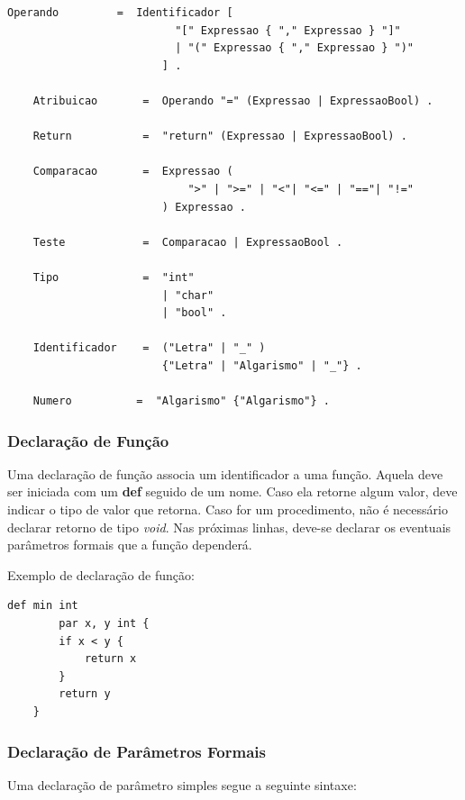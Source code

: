 \documentclass[a4paper,12pt]{report}
\begin{document}
\begin{lstlisting}[numbers=none,frame=none]
    Operando         =  Identificador [
                          "[" Expressao { "," Expressao } "]"
                          | "(" Expressao { "," Expressao } ")"
                        ] .

    Atribuicao       =  Operando "=" (Expressao | ExpressaoBool) .

    Return           =  "return" (Expressao | ExpressaoBool) .

    Comparacao       =  Expressao (
                            ">" | ">=" | "<"| "<=" | "=="| "!="
                        ) Expressao .

    Teste            =  Comparacao | ExpressaoBool .

    Tipo             =  "int"
                        | "char"
                        | "bool" .

    Identificador    =  ("Letra" | "_" )
                        {"Letra" | "Algarismo" | "_"} .

    Numero          =  "Algarismo" {"Algarismo"} .
    \end{lstlisting}

    \subsubsection*{Declaração de Função}
    Uma declaração de função associa um identificador a uma função. Aquela deve ser iniciada com um \textbf{def} seguido de um nome. Caso ela retorne algum valor, deve indicar o tipo de valor que retorna. Caso for um procedimento, não é necessário declarar retorno de tipo \textit{void}. Nas próximas linhas, deve-se declarar os eventuais parâmetros formais que a função dependerá.

    Exemplo de declaração de função:

    \begin{lstlisting}[caption={Declaração de função}]
    def min int
        par x, y int {
        if x < y {
            return x
        }
        return y
    }
    \end{lstlisting}

    \subsubsection*{Declaração de Parâmetros Formais}
    Uma declaração de parâmetro simples segue a seguinte sintaxe:
\end{document}
